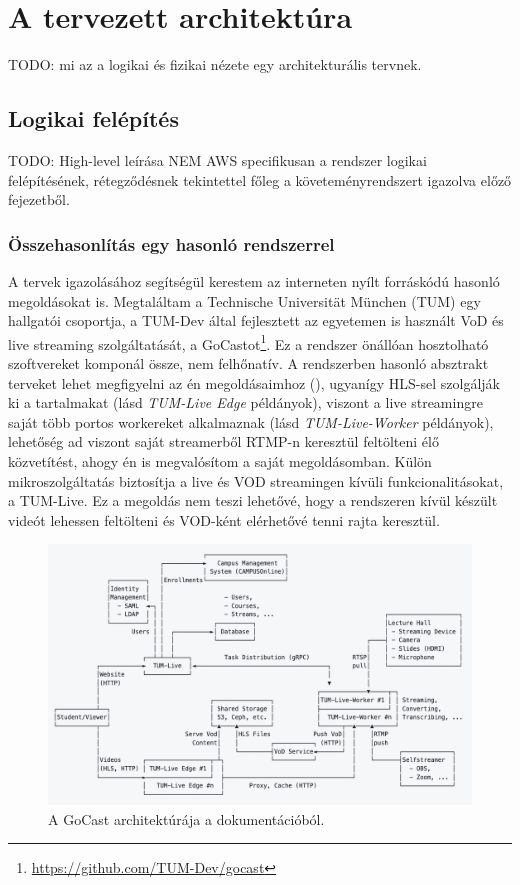 \chapter{A tervezett architektúra}

TODO: mi az a logikai és fizikai nézete egy architekturális tervnek.

\section{Logikai felépítés}

TODO: High-level leírása NEM AWS specifikusan a rendszer logikai felépítésének, rétegződésnek tekintettel főleg a követeményrendszert igazolva előző fejezetből.

\subsection{Összehasonlítás egy hasonló rendszerrel}

A tervek igazolásához segítségül kerestem az interneten nyílt forráskódú hasonló megoldásokat is. Megtaláltam a Technische Universität München (TUM) egy hallgatói csoportja, a TUM-Dev által fejlesztett az egyetemen is használt VoD és live streaming szolgáltatását, a GoCastot\footnote{\url{https://github.com/TUM-Dev/gocast}}. Ez a rendszer önállóan hosztolható szoftvereket komponál össze, nem felhőnatív. A rendszerben hasonló absztrakt terveket lehet megfigyelni az én megoldásaimhoz (), ugyanígy HLS-sel szolgálják ki a tartalmakat (lásd \emph{TUM-Live Edge} példányok), viszont a live streamingre saját több portos workereket alkalmaznak (lásd \emph{TUM-Live-Worker} példányok), lehetőség ad viszont saját streamerből RTMP-n keresztül feltölteni élő közvetítést, ahogy én is megvalósítom a saját megoldásomban. Külön mikroszolgáltatás biztosítja a live és VOD streamingen kívüli funkcionalitásokat, a TUM-Live. Ez a megoldás nem teszi lehetővé, hogy a rendszeren kívül készült videót lehessen feltölteni és VOD-ként elérhetővé tenni rajta keresztül.

\begin{figure}[ht]
	\centering
	\includegraphics[width=140mm, keepaspectratio]{figures/gocast.png}
	\caption{A GoCast architektúrája a dokumentációból.}
	\label{fig:gocast}
\end{figure}

